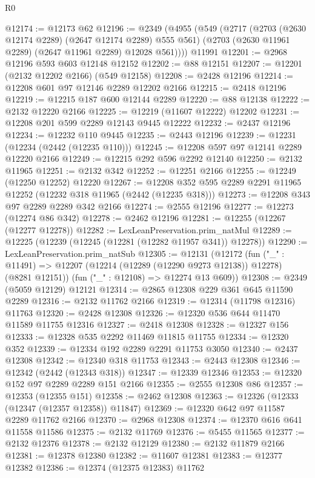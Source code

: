 \begin{lexlean}{R0}
\begin{coremodule}
@12174 := @12173 @62
@12196 := @2349
    (@4955
      (@549
        (@2717
          (@2703 (@2630 @12174 @2289) (@2647 @12174 @2289) @555 @561)
          (@2703 (@2630 @11961 @2289) (@2647 @11961 @2289) @12028 @561))))
    @11991
@12201 := @2968 @12196 @593 @603 @12148 @12152
@12202 := @88 @12151
@12207 := @12201 (@2132 @12202 @2166) (@549 @12158)
@12208 := @2428 @12196
@12214 := @12208 @601 @97 @12146 @2289 @12202 @2166
@12215 := @2418 @12196
@12219 := @12215 @187 @600 @12144 @2289
@12220 := @88 @12138
@12222 := @2132 @12220 @2166
@12225 := @12219 (@11607 @12222) @12202
@12231 := @12208 @201 @599 @2289 @12143 @9445 @12222
@12232 := @2437 @12196
@12234 := @12232 @110 @9445
@12235 := @2443 @12196
@12239 := @12231 (@12234 (@2442 (@12235 @110)))
@12245 := @12208 @597 @97 @12141 @2289 @12220 @2166
@12249 := @12215 @292 @596 @2292 @12140
@12250 := @2132 @11965
@12251 := @2132 @342
@12252 := @12251 @2166
@12255 := @12249 (@12250 @12252) @12220
@12267 := @12208 @352 @595 @2289 @2291 @11965 @12252 (@12232 @318 @11965 (@2442 (@12235 @318)))
@12273 := @12208 @343 @97 @2289 @2289 @342 @2166
@12274 := @2555 @12196
@12277 := @12273 (@12274 @86 @342)
@12278 := @2462 @12196
@12281 := @12255 (@12267 (@12277 @12278))
@12282 := LexLeanPreservation.prim_natMul
@12289 := @12225 (@12239 (@12245 (@12281 (@12282 @11957 @341)) @12278))
@12290 := LexLeanPreservation.prim_natSub
@12305 := @12131
    (@12172
      (fun ("_" : @11491) => @12207 (@12214 (@12289 (@12290 @9273 @12138)) @12278) (@8281 @12151))
      (fun ("_" : @12108) => @12274 @13 @609))
@12308 := @2349 (@5059 @12129) @12121
@12314 := @2865 @12308 @229 @361 @645 @11590 @2289
@12316 := @2132 @11762 @2166
@12319 := @12314 (@11798 @12316) @11763
@12320 := @2428 @12308
@12326 := @12320 @536 @644 @11470 @11589 @11755 @12316
@12327 := @2418 @12308
@12328 := @12327 @156
@12333 := @12328 @535 @2292 @11469 @11815 @11755
@12334 := @12320 @352
@12339 := @12334 @192 @2289 @2291 @11753 @3050
@12340 := @2437 @12308
@12342 := @12340 @318 @11753
@12343 := @2443 @12308
@12346 := @12342 (@2442 (@12343 @318))
@12347 := @12339 @12346
@12353 := @12320 @152 @97 @2289 @2289 @151 @2166
@12355 := @2555 @12308 @86
@12357 := @12353 (@12355 @151)
@12358 := @2462 @12308
@12363 := @12326 (@12333 (@12347 (@12357 @12358)) @11847)
@12369 := @12320 @642 @97 @11587 @2289 @11762 @2166
@12370 := @2968 @12308
@12374 := @12370 @616 @641 @11558 @11586
@12375 := @2132 @11769
@12376 := @5455 @11565
@12377 := @2132 @12376
@12378 := @2132 @12129
@12380 := @2132 @11879 @2166
@12381 := @12378 @12380
@12382 := @11607 @12381
@12383 := @12377 @12382
@12386 := @12374 (@12375 @12383) @11762

\end{coremodule}
\end{lexlean}
